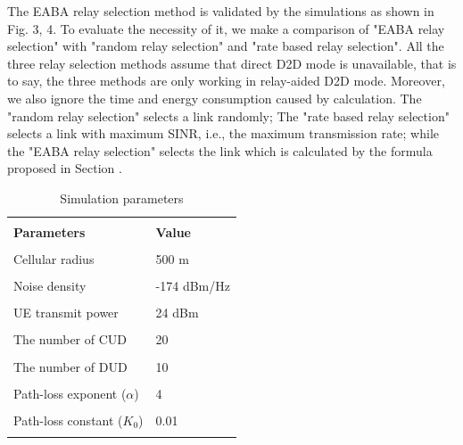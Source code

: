 \documentclass[conference]{IEEEtran}
\begin{document}
The EABA relay selection method is validated by the simulations as shown in Fig. 3, 4. To evaluate the necessity of it, we make a comparison of "EABA relay selection" with "random relay selection" and "rate based relay selection". All the three relay selection methods assume that direct D2D mode is unavailable, that is to say, the three methods are only working in relay-aided D2D mode. Moreover, we also ignore the time and energy consumption caused by calculation. The "random relay selection" selects a link randomly; The "rate based relay selection" selects a link with maximum SINR, i.e., the maximum transmission rate; while the "EABA relay selection" selects the link which is calculated by the formula proposed in Section \uppercase\expandafter{}.
\begin{table}[!t]
  \centering
  \scriptsize
  \caption{Simulation parameters}
  \label{tab:notations}
  \begin{tabular}{m{3cm}m{3cm}}
    \\[-2mm]
    \hline\\[-2mm]
    {\bf  Parameters}& {\bf Value}\\
    \hline
    \hline
    \vspace{1mm}\\[-3mm]
    Cellular radius      &    500 m\\
    \hline
    \vspace{1mm}\\[-3mm]
    Noise density &    -174 dBm/Hz \\
    \hline
    \vspace{1mm}\\[-3mm]
    UE transmit power  &  24 dBm\\
    \hline
    \vspace{1mm}\\[-3mm]
    The number of CUD  &  20 \\
    \hline
    \vspace{1mm}\\[-3mm]
    The number of DUD  &  10 \\
    \hline
    \vspace{1mm}\\[-3mm]
    Path-loss exponent ($\alpha$) &  4 \\
    \hline
    \vspace{1mm}\\[-3mm]
    Path-loss constant ($K_0$) &   0.01\\
    \hline
    \vspace{1mm}\\[-3mm]

\end{tabular}
\end{table}
\end{document}
